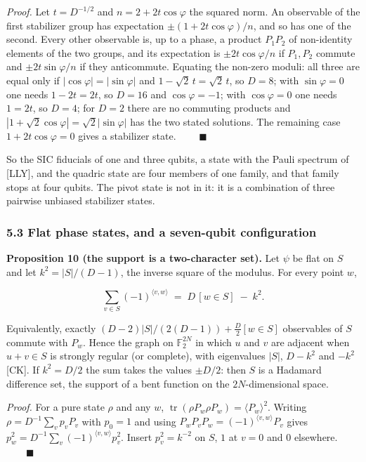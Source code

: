 \documentclass[11pt,a4paper]{article}
\begin{document}
\emph{Proof.} Let \(t = D^{-1/2}\) and \(n = 2 + 2t\cos\varphi\) the squared norm. An observable of the first
stabilizer group has expectation \(\pm(1 + 2t\cos\varphi)/n\), and so has one of the second. Every other
observable is, up to a phase, a product \(P_1P_2\) of non-identity elements of the two groups, and its
expectation is \(\pm 2t\cos\varphi/n\) if \(P_1, P_2\) commute and \(\pm 2t\sin\varphi/n\) if they anticommute.
Equating the non-zero moduli: all three are equal only if \(|\cos\varphi| = |\sin\varphi|\) and
\(1 - \sqrt2\,t = \sqrt2\,t\), so \(D = 8\); with \(\sin\varphi = 0\) one needs \(1 - 2t = 2t\), so \(D = 16\) and
\(\cos\varphi = -1\); with \(\cos\varphi = 0\) one needs \(1 = 2t\), so \(D = 4\); for \(D = 2\) there are no
commuting products and \(|1 + \sqrt2\cos\varphi| = \sqrt2|\sin\varphi|\) has the two stated solutions.
The remaining case \(1 + 2t\cos\varphi = 0\) gives a stabilizer state. \(\qquad\blacksquare\)

So the SIC fiducials of one and three qubits, a state with the Pauli spectrum of {[}LLY{]}, and the
quadric state are four members of one family, and that family stops at four qubits. The pivot state is
not in it: it is a combination of three pairwise unbiased stabilizer states.

\subsubsection{5.3 Flat phase states, and a seven-qubit configuration}\label{53-flat-phase-states-and-a-seven-qubit-configuration}

\textbf{Proposition 10 (the support is a two-character set).} Let \(\psi\) be flat on \(S\) and let
\(k^2 = |S|/(D-1)\), the inverse square of the modulus. For every point \(w\),

\[\sum_{v \in S} (-1)^{\langle v, w\rangle} \;=\; D\,[w \in S] \;-\; k^2 .\]

Equivalently, exactly \((D-2)|S|/(2(D-1)) + \tfrac{D}{2}[w \in S]\) observables of \(S\) commute with \(P_w\).
Hence the graph on \(\mathbb{F}_2^{2N}\) in which \(u\) and \(v\) are adjacent when \(u + v \in S\) is strongly
regular (or complete), with eigenvalues \(|S|\), \(D - k^2\) and \(-k^2\) {[}CK{]}. If \(k^2 = D/2\) the sum takes
the values \(\pm D/2\): then \(S\) is a Hadamard difference set, the support of a bent function on the
\(2N\)-dimensional space.

\emph{Proof.} For a pure state \(\rho\) and any \(w\), \(\operatorname{tr}(\rho P_w \rho P_w) = \langle P_w\rangle^2\).
Writing \(\rho = D^{-1}\sum_v p_v P_v\) with \(p_0 = 1\) and using \(P_wP_vP_w = (-1)^{\langle v,w\rangle}P_v\)
gives \(p_w^2 = D^{-1}\sum_v (-1)^{\langle v,w\rangle}p_v^2\). Insert \(p_v^2 = k^{-2}\) on \(S\), \(1\) at \(v = 0\)
and \(0\) elsewhere. \(\qquad\blacksquare\)
\end{document}
